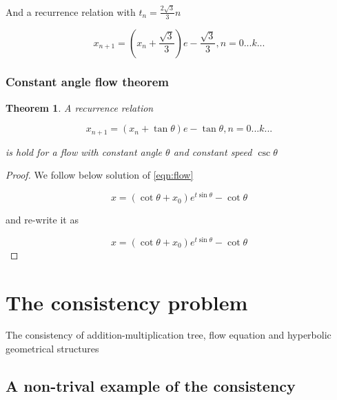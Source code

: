\documentclass{article}
\newtheorem{theorem}{Theorem}
\begin{document}
And a recurrence relation with $t_n = \frac{2\sqrt{3}}{3} n$

\begin{equation}
    x_{n+1} = (x_n + \frac{\sqrt{3}}{3}) e - \frac{\sqrt{3}}{3}, n = 0 ... k ...
\end{equation}

\subsubsection{Constant angle flow theorem}

\begin{theorem}
\label{l1}
A recurrence relation

\begin{equation}
    x_{n+1} = (x_n + \tan \theta) e - \tan \theta, n = 0 ... k ...
\end{equation}

is hold for a flow with constant angle $\theta$ and constant speed $\csc \theta$

\end{theorem}

\begin{proof}

We follow below solution of \eqref{eqn:flow}

\begin{equation}
   x = (\cot \theta + x_0) e^{t \sin \theta} - \cot \theta
\end{equation}

and re-write it as

\begin{equation}
   x = (\cot \theta + x_0) e^{t \sin \theta} - \cot \theta
\end{equation}

\end{proof}

\newpage

\section{The consistency problem}\label{sec:consistency}

The consistency of addition-multiplication tree, flow equation and hyperbolic geometrical structures

\subsection{A non-trival example of the consistency}
\end{document}
